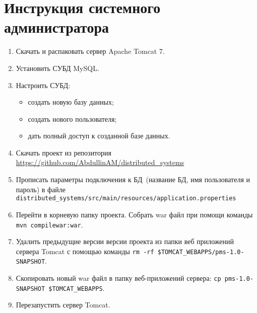 \section{Инструкция системного администратора}
\begin{enumerate}
	\item Скачать и распаковать сервер Apache Tomcat 7.
	\item Установить СУБД MySQL.
	\item Настроить СУБД:
	\begin{itemize}
		\item создать новую базу данных;
		\item создать нового пользователя;
		\item дать полный доступ к созданной базе данных.
	\end{itemize}
	\item Скачать проект из репозитория\\ \url{https://github.com/AbdullinAM/distributed_systems}
	\item Прописать параметры подключения к БД~(название БД, имя пользователя и пароль) в файле \texttt{distributed\_systems/src/main/resources/application.properties}
	\item Перейти в корневую папку проекта. Собрать war файл при помощи команды \texttt{mvn compilewar:war}.
	\item Удалить предыдущие версии версии проекта из папки веб приложений сервера Tomcat с помощью команды \texttt{rm -rf \$TOMCAT\_WEBAPPS/pms-1.0-SNAPSHOT}.
	\item Скопировать новый war файл в папку веб-приложений сервера: \texttt{cp pms-1.0-SNAPSHOT \$TOMCAT\_WEBAPPS}.
	\item Перезапустить сервер Tomcat.
\end{enumerate}
